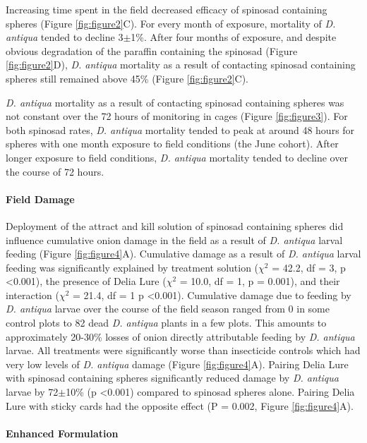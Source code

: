 \documentclass[num-refs]{wiley-article}
\begin{document}
Increasing time spent in the field decreased efficacy of spinosad containing spheres (Figure \ref{fig:figure2}C).  For every month of exposure, mortality of \textit{D. antiqua} tended to decline 3$\pm$1\%.  After four months of exposure, and despite obvious degradation of the paraffin containing the spinosad (Figure \ref{fig:figure2}D), \textit{D. antiqua} mortality as a result of contacting spinosad containing spheres still remained above 45\% (Figure \ref{fig:figure2}C).  

\textit{D. antiqua} mortality as a result of contacting spinosad containing spheres was not constant over the 72 hours of monitoring in cages (Figure \ref{fig:figure3}).  For both spinosad rates, \textit{D. antiqua} mortality tended to peak at around 48 hours for spheres with one month exposure to field conditions (the June cohort).  After longer exposure to field conditions, \textit{D. antiqua} mortality tended to decline over the course of 72 hours.  

\paragraph{Field Damage}

Deployment of the attract and kill solution of spinosad containing spheres did influence cumulative onion damage in the field as a result of \textit{D. antiqua} larval feeding (Figure \ref{fig:figure4}A).  Cumulative damage as a result of \textit{D. antiqua} larval feeding was significantly explained by treatment solution ($\chi^2$ = 42.2, df = 3, p \textless 0.001), the presence of Delia Lure ($\chi^2$ = 10.0, df = 1, p = 0.001), and their interaction ($\chi^2$ = 21.4, df = 1 p \textless 0.001).  Cumulative damage due to feeding by \textit{D. antiqua} larvae over the course of the field season ranged from 0 in some control plots to 82 dead \textit{D. antiqua} plants in a few plots. This amounts to approximately 20-30\% losses of onion directly attributable feeding by \textit{D. antiqua} larvae.  All treatments were significantly worse than insecticide controls which had very low levels of \textit{D. antiqua} damage (Figure \ref{fig:figure4}A).  Pairing Delia Lure with spinosad containing spheres significantly reduced damage by \textit{D. antiqua} larvae by 72$\pm$10\% (p \textless 0.001) compared to spinosad spheres alone.  Pairing Delia Lure with sticky cards had the opposite effect (P = 0.002, Figure \ref{fig:figure4}A).

\paragraph{Enhanced Formulation}
\end{document}
